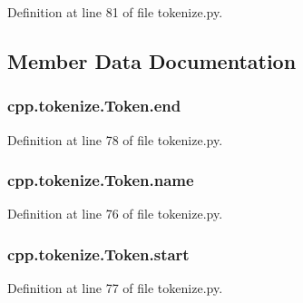 Definition at line 81 of file tokenize.\+py.



\subsection{Member Data Documentation}
\subsubsection[{\texorpdfstring{end}{end}}]{\setlength{\rightskip}{0pt plus 5cm}cpp.\+tokenize.\+Token.\+end}\hypertarget{classcpp_1_1tokenize_1_1_token_a9935738c382352eca19834c2533715db}{}\label{classcpp_1_1tokenize_1_1_token_a9935738c382352eca19834c2533715db}


Definition at line 78 of file tokenize.\+py.

\subsubsection[{\texorpdfstring{name}{name}}]{\setlength{\rightskip}{0pt plus 5cm}cpp.\+tokenize.\+Token.\+name}\hypertarget{classcpp_1_1tokenize_1_1_token_a90859dd16bde71bc38f717f5119e63b9}{}\label{classcpp_1_1tokenize_1_1_token_a90859dd16bde71bc38f717f5119e63b9}


Definition at line 76 of file tokenize.\+py.

\subsubsection[{\texorpdfstring{start}{start}}]{\setlength{\rightskip}{0pt plus 5cm}cpp.\+tokenize.\+Token.\+start}\hypertarget{classcpp_1_1tokenize_1_1_token_a8ec48e348ff29901857cb21553da464b}{}\label{classcpp_1_1tokenize_1_1_token_a8ec48e348ff29901857cb21553da464b}


Definition at line 77 of file tokenize.\+py.


